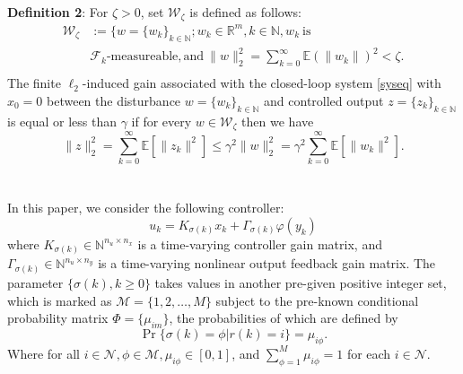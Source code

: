 \documentclass[conference]{IEEEtran}
\begin{document}
\textbf{Definition 2}: For $\zeta>0$, set $\mathcal{W}_{\zeta} $ is defined as follows:
\begin{equation}
	\begin{split}
		\mathcal{W}_{\zeta}&:=\{w=\{w_k\}_{k\in\mathbb{N}};w_k\in\mathbb{R}^{m}, k\in\mathbb{N}, w_k \ \text{is} \\
		&\mathcal{F}_k\text{-measureable}, \text{and}\  \|w\|^2_2=\sum_{k=0}^{\infty}\mathbb{E}(\|w_k\|)^2<\zeta.\\
	\end{split}
\end{equation}
The finite $\ell_2$-induced gain associated with the closed-loop system \eqref{syseq} with $x_0=0$ between the disturbance $w=\{w_k\}_{k\in\mathbb{N}}$ and controlled output $z=\{z_k\}_{k\in\mathbb{N}}$ is equal or less than $\gamma$ if for every $w\in\mathcal{W}_{\zeta}$ then we have
\begin{equation}
\|z\|^2_2=\sum_{k=0}^{\infty}\mathbb{E}\left[\|z_k\|^2\right] \leq \gamma^{2}\|w\|^2_2=\gamma^{2}\sum_{k=0}^{\infty}\mathbb{E}\left[\|w_k\|^2\right].
\end{equation}\\
\\
In this paper, we consider the following controller:
\begin{equation}\label{asycontroller}
u_k=K_{\sigma(k)}x_k+\varGamma_{\sigma(k)}\varphi(y_k) 
\end{equation}
where $K_{\sigma(k)}\in \mathbb{N}^{n_u\times n_x}$ is a time-varying controller gain matrix, and $\varGamma_{\sigma(k)}\in \mathbb{N}^{n_u\times n_y}$ is a time-varying nonlinear output feedback gain matrix. The parameter $\{\sigma(k),k\geq0\}$ takes values in another pre-given positive integer set, which is marked as $\mathcal{M}=\{1,2,\dots,M\}$ subject to the pre-known conditional probability matrix $\varPhi=\{\mu_{im} \}$, the probabilities of which are defined by
\begin{equation}
\Pr\{\sigma(k)=\phi|r(k)=i\}=\mu_{i\phi}.
\end{equation}
Where for all $i\in\mathcal{N}, \phi\in\mathcal{M}, \mu_{i\phi}\in [0,1]$, and $\sum_{\phi=1}^{M}\mu_{i\phi}=1$ for each $i\in\mathcal{N}$.\\
\\
\end{document}
